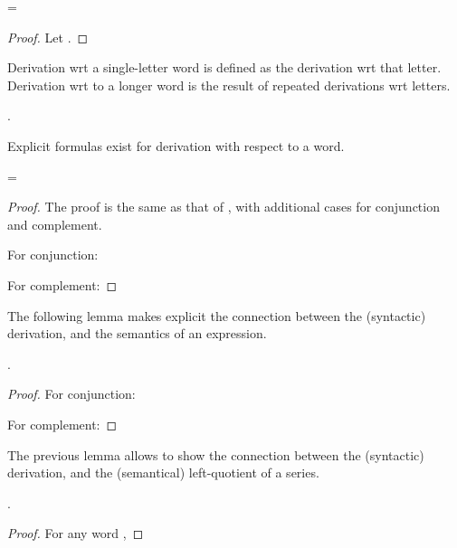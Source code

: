 \documentclass[a4paper,USenglish]{lipics}
\begin{document}
\begin{Lemma}\label{lem:der:poly}
  \abovedisplayskip=\abovedisplayshortskip
  
\end{Lemma}

\begin{proof}
  Let
  .
  

  

  
\end{proof}

Derivation wrt a single-letter word is defined as the derivation wrt that
letter.  Derivation wrt to a longer word is the result of repeated
derivations wrt letters.
\begin{Definition}
  .
\end{Definition}

\begin{Lemma}
  \label{lem:der:words}
  
\end{Lemma}

Explicit formulas exist for derivation with respect to a word.
\begin{Lemma}
  \abovedisplayskip=\abovedisplayshortskip
  \label{lem:der:word}
  
\end{Lemma}

\begin{proof}
  The proof is the same as that of \citep[Prop.~3]{lombardy.2005.tcs}, with
  additional cases for conjunction and complement.

  For conjunction:
  

  For complement:
  
\end{proof}

The following lemma makes explicit the connection between the (syntactic)
derivation, and the semantics of an expression.

\begin{Lemma}
  \label{lem:sem:der:word}
  .
\end{Lemma}

\begin{proof}
  For conjunction:
  

  For complement:
  
\end{proof}


The previous lemma allows to show the connection between the (syntactic)
derivation, and the (semantical) left-quotient of a series.
\begin{theorem}
  \label{thm:sem:derivative}
  .
\end{theorem}
\begin{proof}
  For any word ,
  
\end{proof}
\end{document}

